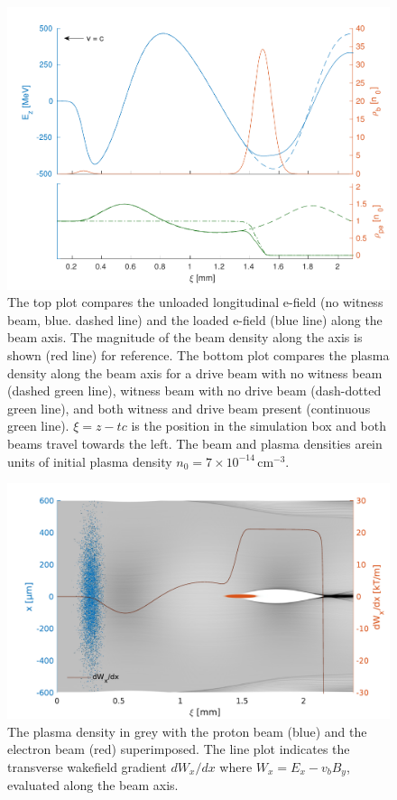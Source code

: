 \documentclass[aps,prstab,reprint,amsmath,amssymb,groupedaddress]{revtex4-1}
\newcommand{\unit}[1]{\,\mathrm{#1}}
\newcommand{\nexp}[1]{\times 10^{#1}}
\begin{document}
\begin{figure}[hbt]
    \includegraphics[width=\linewidth,trim={2mm 0mm 2mm 0mm},clip]{figures/beamLoading}
    \caption{\label{Fig:BeamLoading} The top plot compares the unloaded longitudinal e-field (no witness beam, blue.
        dashed  line) and the loaded e-field (blue line) along the beam axis. The magnitude of the beam density along
        the axis is shown (red line) for reference. The bottom plot compares the plasma density along the beam axis for
        a drive beam with no witness beam (dashed green line), witness beam with no drive beam (dash-dotted green line),
        and both witness and drive beam present (continuous green line). $\xi = z - tc$ is the position in the
        simulation box and both beams travel towards the left. The beam and plasma densities arein units of initial
        plasma density $n_{0} = 7\nexp{-14}\unit{cm}^{-3}$.}
\end{figure}

\begin{figure}[hbt]
    \includegraphics[width=\linewidth,trim={2mm 0mm 2mm 0mm},clip]{figures/plasmaDenTWake}
    \caption{\label{Fig:PlasmaDenTWake} The plasma density in grey with the proton beam (blue) and the electron beam
        (red) superimposed. The line plot indicates the transverse wakefield gradient $dW_{x}/dx$ where
        $W_{x} = E_{x} - v_{b} B_{y}$, evaluated along the beam axis.}
\end{figure}
\end{document}
